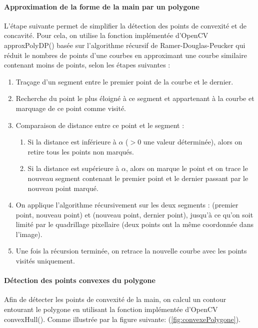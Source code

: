 \paragraph{Approximation de la forme de la main par un polygone}
L’étape suivante permet de simplifier la détection des points de convexité et de concavité. Pour cela, on utilise la fonction implémentée d’OpenCV approxPolyDP() basée sur l’algorithme récursif de Ramer-Douglas-Peucker qui réduit le nombres de points d’une courbes en approximant une courbe similaire contenant moins de points, selon les étapes suivantes :

\begin{enumerate}
\item Traçage d’un segment entre le premier point de la courbe et le dernier.
\item Recherche du point le plus éloigné à ce segment et appartenant à la courbe et marquage de ce point comme visité.
\item Comparaison de distance entre ce point et le segment :
\begin{enumerate}
\item Si la distance est inférieure à $\alpha$ ($>0$ une valeur déterminée), alors on retire tous les points non marqués.
\item Si la distance est supérieure à $\alpha$, alors on marque le point et on trace le nouveau segment contenant le premier point et le dernier passant par le nouveau point marqué.
\end{enumerate}
\item On applique l’algorithme récursivement sur les deux segments : (premier point, nouveau point) et (nouveau point, dernier point), jusqu'à ce qu'on soit limité par le quadrillage pixellaire (deux points ont la même coordonnée dans l'image).
\item Une fois la récursion terminée, on retrace la nouvelle courbe avec les points visités uniquement.
\end{enumerate}

\paragraph{Détection des points convexes du polygone}
Afin de détecter les points de convexité de la main, on calcul un contour entourant le polygone en utilisant la fonction implémentée d’OpenCV convexHull(). Comme illustrée par la figure suivante: (\autoref{fig:convexePolygone}).

